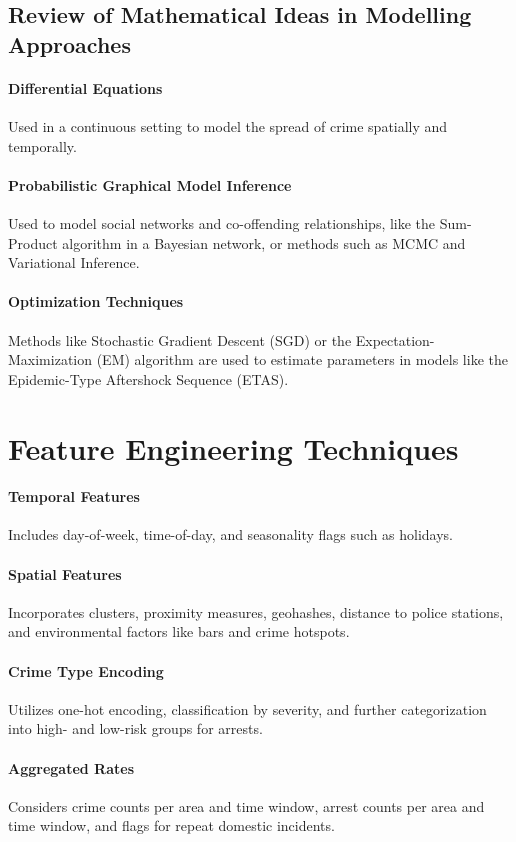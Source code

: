 \documentclass{article}
\begin{document}
\subsection{Review of Mathematical Ideas in Modelling Approaches}
\paragraph{Differential Equations} Used in a continuous setting to model the spread of crime spatially and temporally.
\paragraph{Probabilistic Graphical Model Inference} Used to model social networks and co-offending relationships, like the Sum-Product algorithm in a Bayesian network, or methods such as MCMC and Variational Inference.
\paragraph{Optimization Techniques} Methods like Stochastic Gradient Descent (SGD) or the Expectation-Maximization (EM) algorithm are used to estimate parameters in models like the Epidemic-Type Aftershock Sequence (ETAS).

\section{Feature Engineering Techniques}
\paragraph{Temporal Features} Includes day-of-week, time-of-day, and seasonality flags such as holidays.
\paragraph{Spatial Features} Incorporates clusters, proximity measures, geohashes, distance to police stations, and environmental factors like bars and crime hotspots.
\paragraph{Crime Type Encoding} Utilizes one-hot encoding, classification by severity, and further categorization into high- and low-risk groups for arrests.
\paragraph{Aggregated Rates} Considers crime counts per area and time window, arrest counts per area and time window, and flags for repeat domestic incidents.
\end{document}
